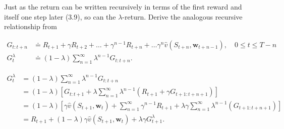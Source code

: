
\begin{exercise}[Exercise 12.1]

Just as the return can be written recursively in terms of the first reward
and itself one step later (3.9), so can the $\lambda$-return.
Derive the analogous recursive relationship from

\begin{align}
    G_{t:t+n} &\doteq R_{t+1} + \gamma R_{t+2} + \dots + \gamma^{n-1}R_{t+n} + \dots \gamma^n \hat{v}(S_{t+n}, \textbf{w}_{t+n-1}), \quad 0 \leq t \leq T - n \tag{12.1} \\
    G_t^\lambda &\doteq (1-\lambda)\sum_{n=1}^{\infty} \lambda^{n-1} G_{t:t+n}. \tag{12.2}
\end{align}

\end{exercise}


\begin{solution}

\phantom{}

\begin{align*}
    G_{t}^\lambda 
    &= (1-\lambda)\sum_{n=1}^{\infty} \lambda^{n-1} G_{t:t+n} \\
    &= (1-\lambda)\left[G_{t:t+1} +  \lambda \sum_{n=1}^{\infty}\lambda^{n-1}(R_{t+1} + \gamma G_{t+1:t+n+1})\right] \\
    &= (1-\lambda)\left[\gamma \hat{v}(S_{t+1}, \textbf{w}_t) +  \sum_{n=1}^{\infty}  \gamma^{n-1} R_{t+1} + \lambda \gamma \sum_{n=1}^{\infty}\lambda^{n-1}(G_{t+1:t+n+1})\right] \\
    &= R_{t+1} + (1-\lambda)\gamma \hat{v}(S_{t+1}, \textbf{w}_t) + \lambda \gamma G_{t+1}^\lambda.
\end{align*}

\end{solution}

